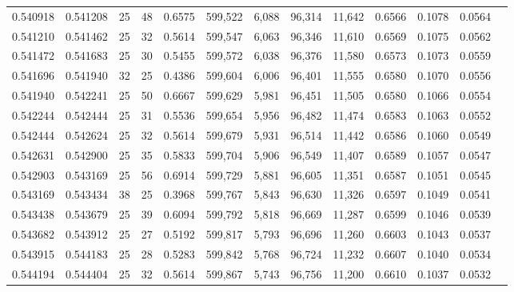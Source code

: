 \begin{tabular}{rrrrrrrrrrrrr}
0.540918 & 0.541208 &    25 &  48 &                                     0.6575 & 599,522 &   6,088 &  96,314 &  11,642 & 0.6566 & 0.1078 & 0.0564 \\
0.541210 & 0.541462 &    25 &  32 &                                     0.5614 & 599,547 &   6,063 &  96,346 &  11,610 & 0.6569 & 0.1075 & 0.0562 \\
0.541472 & 0.541683 &    25 &  30 &                                     0.5455 & 599,572 &   6,038 &  96,376 &  11,580 & 0.6573 & 0.1073 & 0.0559 \\
0.541696 & 0.541940 &    32 &  25 &                                     0.4386 & 599,604 &   6,006 &  96,401 &  11,555 & 0.6580 & 0.1070 & 0.0556 \\
0.541940 & 0.542241 &    25 &  50 &                                     0.6667 & 599,629 &   5,981 &  96,451 &  11,505 & 0.6580 & 0.1066 & 0.0554 \\
0.542244 & 0.542444 &    25 &  31 &                                     0.5536 & 599,654 &   5,956 &  96,482 &  11,474 & 0.6583 & 0.1063 & 0.0552 \\
0.542444 & 0.542624 &    25 &  32 &                                     0.5614 & 599,679 &   5,931 &  96,514 &  11,442 & 0.6586 & 0.1060 & 0.0549 \\
0.542631 & 0.542900 &    25 &  35 &                                     0.5833 & 599,704 &   5,906 &  96,549 &  11,407 & 0.6589 & 0.1057 & 0.0547 \\
0.542903 & 0.543169 &    25 &  56 &                                     0.6914 & 599,729 &   5,881 &  96,605 &  11,351 & 0.6587 & 0.1051 & 0.0545 \\
0.543169 & 0.543434 &    38 &  25 &                                     0.3968 & 599,767 &   5,843 &  96,630 &  11,326 & 0.6597 & 0.1049 & 0.0541 \\
0.543438 & 0.543679 &    25 &  39 &                                     0.6094 & 599,792 &   5,818 &  96,669 &  11,287 & 0.6599 & 0.1046 & 0.0539 \\
0.543682 & 0.543912 &    25 &  27 &                                     0.5192 & 599,817 &   5,793 &  96,696 &  11,260 & 0.6603 & 0.1043 & 0.0537 \\
0.543915 & 0.544183 &    25 &  28 &                                     0.5283 & 599,842 &   5,768 &  96,724 &  11,232 & 0.6607 & 0.1040 & 0.0534 \\
0.544194 & 0.544404 &    25 &  32 &                                     0.5614 & 599,867 &   5,743 &  96,756 &  11,200 & 0.6610 & 0.1037 & 0.0532 \\

\end{tabular}
